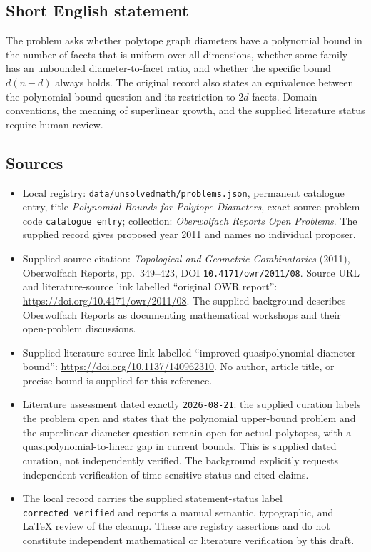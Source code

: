 \documentclass[11pt]{article}
\begin{document}
\subsection{Short English statement}
The problem asks whether polytope graph diameters have a polynomial bound in the number of facets that is uniform over all dimensions, whether some family has an unbounded diameter-to-facet ratio, and whether the specific bound $d(n-d)$ always holds. The original record also states an equivalence between the polynomial-bound question and its restriction to $2d$ facets. Domain conventions, the meaning of superlinear growth, and the supplied literature status require human review.
\subsection{Sources}
\begin{itemize}
\item Local registry: \texttt{data/unsolvedmath/problems.json}, permanent catalogue entry, title \emph{Polynomial Bounds for Polytope Diameters}, exact source problem code \texttt{catalogue entry}; collection: \emph{Oberwolfach Reports Open Problems}. The supplied record gives proposed year 2011 and names no individual proposer.
\item Supplied source citation: \emph{Topological and Geometric Combinatorics} (2011), Oberwolfach Reports, pp.~349--423, DOI \texttt{10.4171/owr/2011/08}. Source URL and literature-source link labelled ``original OWR report'': \url{https://doi.org/10.4171/owr/2011/08}. The supplied background describes Oberwolfach Reports as documenting mathematical workshops and their open-problem discussions.
\item Supplied literature-source link labelled ``improved quasipolynomial diameter bound'': \url{https://doi.org/10.1137/140962310}. No author, article title, or precise bound is supplied for this reference.
\item Literature assessment dated exactly \texttt{2026-08-21}: the supplied curation labels the problem open and states that the polynomial upper-bound problem and the superlinear-diameter question remain open for actual polytopes, with a quasipolynomial-to-linear gap in current bounds. This is supplied dated curation, not independently verified. The background explicitly requests independent verification of time-sensitive status and cited claims.
\item The local record carries the supplied statement-status label \texttt{corrected\_verified} and reports a manual semantic, typographic, and LaTeX review of the cleanup. These are registry assertions and do not constitute independent mathematical or literature verification by this draft.
\end{itemize}
\end{document}

